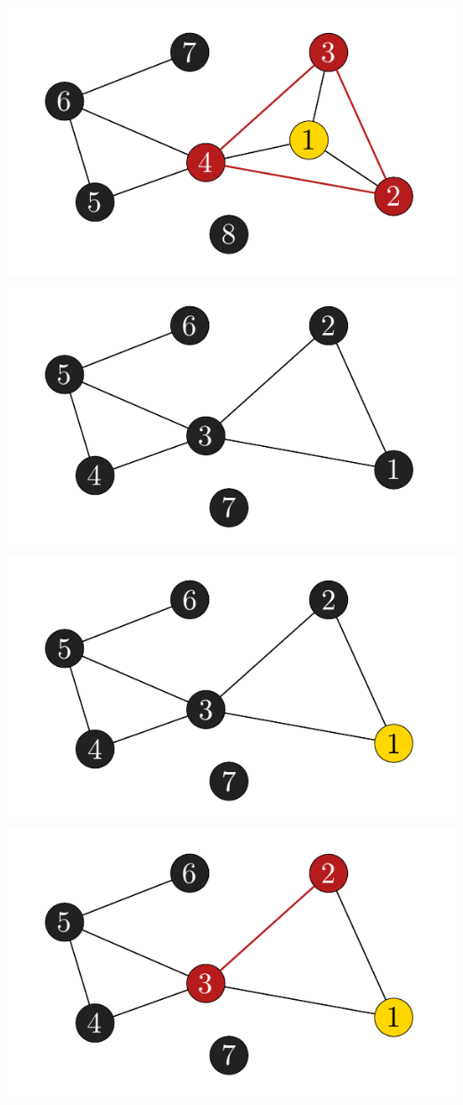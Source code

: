\documentclass[xcolor=x11names,compress]{beamer}
\begin{document}
\begin{frame}
\begin{center}
\begin{overprint}
			\includegraphics[scale=1.0]{img/graph/peo/04.pdf}
			\onslide<5>\includegraphics[scale=1.0]{img/graph/peo/05.pdf}
			\onslide<6>\includegraphics[scale=1.0]{img/graph/peo/06.pdf}
			\onslide<7>\includegraphics[scale=1.0]{img/graph/peo/07.pdf}

\end{overprint}
\end{center}
\end{frame}
\end{document}
